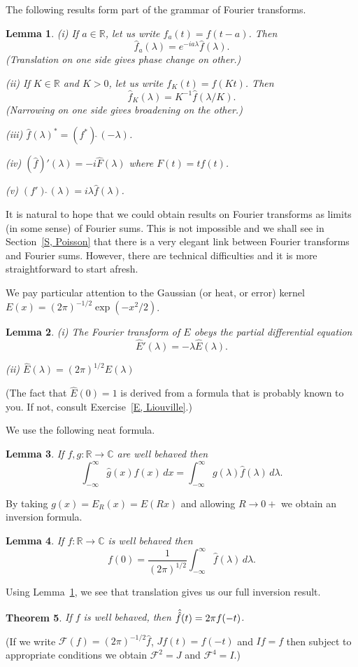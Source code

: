 \documentclass[12pt]{article}
\newtheorem{theorem}{Theorem}[section]
\newtheorem{lemma}[theorem]{Lemma}
\theoremstyle{definition}
\begin{document}
The following results form part of the grammar of
Fourier transforms.
\begin{lemma}\label{L, grammar} 
(i) If $a\in{\mathbb R}$, let us write
$f_{a}(t)=f(t-a)$. Then
\[\hat{f}_{a}(\lambda)=e^{-ia\lambda}\hat{f}(\lambda).\]
(Translation on one side gives phase change on other.)

(ii) If $K\in{\mathbb R}$ and $K>0$, let us write
$f_{K}(t)=f(Kt)$. Then
\[\hat{f}_{K}(\lambda)=K^{-1}\hat{f}(\lambda/K).\]
(Narrowing on one side gives broadening on the other.)

(iii) $\hat{f}(\lambda)^{*}=(f^{*})\hat{\ }(-\lambda)$.

(iv) $(\hat{f})'(\lambda)
=-i\hat{F}(\lambda)$ where $F(t)=tf(t)$.

(v) $(f')\hat{\ }(\lambda)=i\lambda\hat{f}(\lambda)$.
\end{lemma}

It is natural to hope that we could obtain results on Fourier
transforms as limits (in some sense) of Fourier sums.
This is not impossible and we shall see in Section~\ref{S, Poisson}
that there is a very elegant link between Fourier
transforms and Fourier sums. However, there are technical 
difficulties and it is more straightforward to start afresh.

We pay particular attention to the Gaussian (or heat, or error)
kernel $E(x)=(2\pi)^{-1/2}\exp(-x^{2}/2)$.
\begin{lemma}\label{L, Fourier of Gauss}
(i) The Fourier transform of $E$ obeys the partial differential
equation
\[\hat{E}'(\lambda)=-\lambda\hat{E}(\lambda).\]

(ii) $\hat{E}(\lambda)=(2\pi)^{1/2}E(\lambda)$
\end{lemma}
(The fact that $\hat{E}(0)=1$ is derived from a formula
that is probably known to you. If not, consult
Exercise~\ref{E, Liouville}.)

We use the following neat formula.
\begin{lemma}\label{L neat} If $f,g:{\mathbb R}\rightarrow{\mathbb C}$
are well behaved then
\[\int_{-\infty}^{\infty}\hat{g}(x)f(x)\,dx
=\int_{-\infty}^{\infty}g(\lambda)\hat{f}(\lambda)\,d\lambda.\]
\end{lemma}

By taking $g(x)=E_{R}(x)=E(Rx)$ and allowing $R\rightarrow 0+$
we obtain an inversion formula.
\begin{lemma}\label{L start inversion} 
If $f:{\mathbb R}\rightarrow{\mathbb C}$
is well behaved then
\[f(0)=\frac{1}{(2\pi)^{1/2}}
\int_{-\infty}^{\infty}\hat{f}(\lambda)\,d\lambda.\]
\end{lemma}
Using Lemma~\ref{L, grammar}, we see that translation gives us
our full inversion result.
\begin{theorem}\label{T, inversion transform}
If $f$ is well behaved,
then $\Hat{\Hat{f}}(t)=2\pi f(-t)$.
\end{theorem}
(If we write ${\mathcal F}(f)=(2\pi)^{-1/2}\hat{f}$, $Jf(t)=f(-t)$
and $If=f$ then subject to appropriate conditions we obtain
${\mathcal F}^{2}=J$ and ${\mathcal F}^{4}=I$.)
\end{document}

